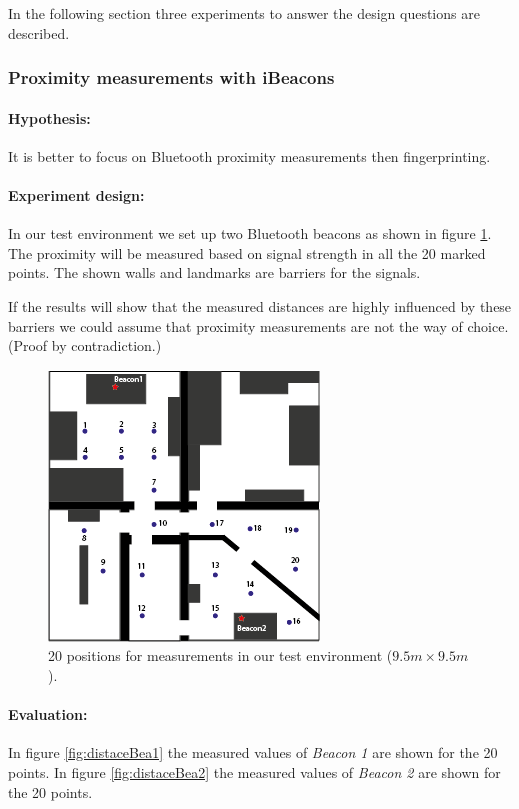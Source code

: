 In the following section three experiments to answer the design questions are described.

\subsubsection{Proximity measurements with iBeacons}

\paragraph{Hypothesis: }
It is better to focus on Bluetooth proximity measurements then fingerprinting. 

\paragraph{Experiment design: } 
In our test environment we set up two Bluetooth beacons as shown in figure \ref{fig:positionsBea}. The proximity will be measured based on signal strength in all the 20 marked points. The shown walls and landmarks are barriers for the signals. 

If the results will show that the measured distances are highly influenced by these barriers we could assume that proximity measurements are not the way of choice. (Proof by contradiction.)

\begin{figure}[h]
	\centering
		\includegraphics[width=.4\textwidth]{images/floorplan2ndf+positions.png}
	\caption{20 positions for measurements in our test environment ($9.5m\times 9.5m$).}
	\label{fig:positionsBea}
\end{figure}

\paragraph{Evaluation: } 
In figure \ref{fig:distaceBea1} the measured values of \textit{Beacon 1} are shown for the 20 points. In figure \ref{fig:distaceBea2} the measured values of \textit{Beacon 2} are shown for the 20 points. 


